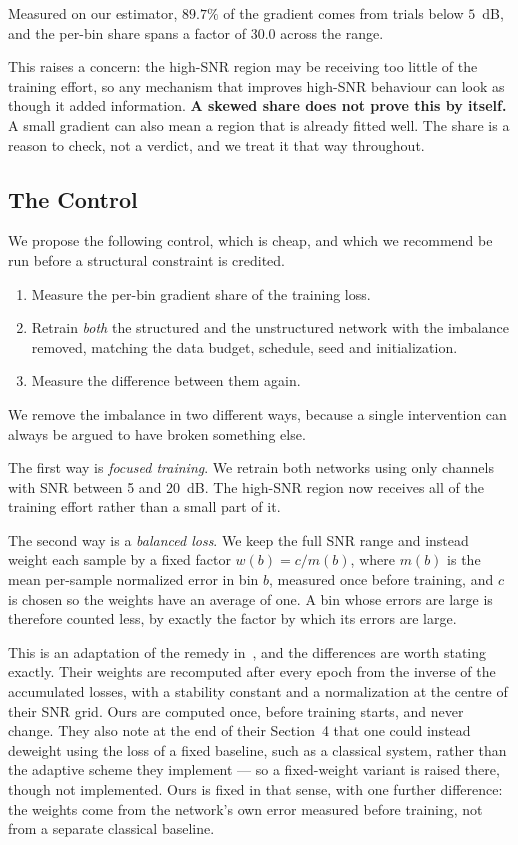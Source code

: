 \documentclass[journal]{IEEEtran}
\begin{document}
Measured on our estimator, $89.7\%$ of the gradient comes from trials below
$5$~dB, and the per-bin share spans a factor of $30.0$ across the range.

This raises a concern: the high-SNR region may be receiving too little of the
training effort, so any mechanism that improves high-SNR behaviour can look as
though it added information. \textbf{A skewed share does not prove this by
itself.} A small gradient can also mean a region that is already fitted well.
The share is a reason to check, not a verdict, and we treat it that way
throughout.

\subsection{The Control}

We propose the following control, which is cheap, and which we recommend be run
before a structural constraint is credited.

\begin{enumerate}
\item Measure the per-bin gradient share of the training loss.
\item Retrain \emph{both} the structured and the unstructured network with the
imbalance removed, matching the data budget, schedule, seed and
initialization.
\item Measure the difference between them again.
\end{enumerate}

We remove the imbalance in two different ways, because a single intervention
can always be argued to have broken something else.

The first way is \emph{focused training}. We retrain both networks using only
channels with SNR between 5 and 20~dB. The high-SNR region now receives all of
the training effort rather than a small part of it.

The second way is a \emph{balanced loss}. We keep the full SNR range and
instead weight each sample by a fixed factor $w(b)=c/m(b)$, where $m(b)$ is the
mean per-sample normalized error in bin $b$, measured once before training, and
$c$ is chosen so the weights have an average of one. A bin whose errors are
large is therefore counted less, by exactly the factor by which its errors are
large.

This is an adaptation of the remedy in~\cite{wiesmayr2023bler}, and the
differences are worth stating exactly. Their weights are recomputed after every
epoch from the inverse of the accumulated losses, with a stability constant and
a normalization at the centre of their SNR grid. Ours are computed once, before
training starts, and never change. They also note at the end of their Section~4
that one could instead deweight using the loss of a fixed baseline, such as a
classical system, rather than the adaptive scheme they implement --- so a
fixed-weight variant is raised there, though not implemented. Ours is fixed in
that sense, with one further difference: the weights come from the network's
own error measured before training, not from a separate classical baseline.
\end{document}

